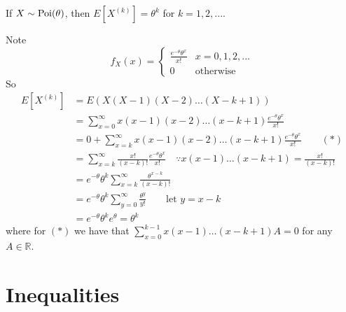 \documentclass[notoc,notitlepage]{tufte-book}
\begin{document}
\begin{eg}
  If $X \sim \operatorname{Poi}(\theta)$, then $E[ X^{(k)} ] = \theta^k$ for $k = 1, 2, ...$.

  \begin{solution}
    Note
    \begin{equation*}
      f_X (x) = \begin{cases}
        \frac{e^{-\theta} \theta^x}{x!} & x = 0, 1, 2, ... \\
        0                               & \text{otherwise}
      \end{cases}
    \end{equation*}
    So
    \begin{align*}
      E[ X^{(k)} ]
        &= E( X(X-1)(X-2)\hdots(X-k+1) ) \\
        &= \sum_{x = 0}^{\infty} x(x-1)(x-2)\hdots(x-k+1) \frac{e^{-\theta} \theta^x}{x!} \\
        &= 0 + \sum_{x = k}^{\infty} x(x-1)(x-2)\hdots(x-k+1) \frac{e^{-\theta} \theta^x}{x!} \qquad (*) \\
        &= \sum_{x = k}^{\infty} \frac{x!}{(x - k)!} \frac{e^{-\theta} \theta^x}{x!} \quad \because x(x-1)\hdots(x-k+1)=\frac{x!}{(x - k)!}\\
        &= e^{-\theta} \theta^k \sum_{x = k}^{\infty} \frac{\theta^{x - k}}{(x - k)!} \\
        &= e^{-\theta} \theta^k \sum_{y = 0}^{\infty} \frac{\theta^y}{y!} \qquad \text{let } y = x - k \\
        &= e^{-\theta} \theta^k e^{\theta} = \theta^k
    \end{align*}
    where for $(*)$ we have that $\sum_{x = 0}^{k - 1} x(x-1)\hdots(x-k+1) A = 0$ for any $A \in \mathbb{R}$.
  \end{solution}
\end{eg}



\section{Inequalities}%
\label{sec:inequalities}
\end{document}
